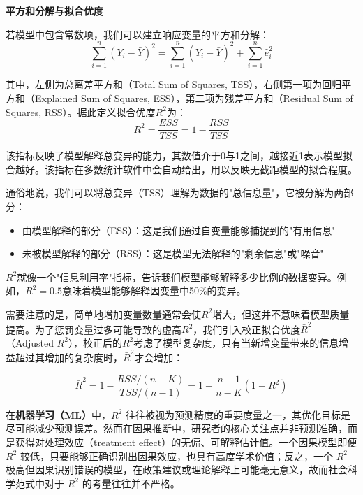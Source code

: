 \newpage

\textbf{平方和分解与拟合优度}

若模型中包含常数项，我们可以建立响应变量的平方和分解：
\begin{equation}
	\sum_{i=1}^n (Y_i - \bar{Y})^2 = \sum_{i=1}^n (\hat{Y}_i - \bar{Y})^2 + \sum_{i=1}^n \hat{e}_i^2
\end{equation}

其中，左侧为总离差平方和（Total Sum of Squares, TSS），右侧第一项为回归平方和（Explained Sum of Squares, ESS），第二项为残差平方和（Residual Sum of Squares, RSS）。据此定义拟合优度$R^2$为：
\begin{equation}
	R^2 = \frac{ESS}{TSS} = 1 - \frac{RSS}{TSS}
\end{equation}

该指标反映了模型解释总变异的能力，其数值介于0与1之间，越接近1表示模型拟合越好。该指标在多数统计软件中会自动给出，用以反映无截距模型的拟合程度。

通俗地说，我们可以将总变异（TSS）理解为数据的"总信息量"，它被分解为两部分：
\begin{itemize}
\item 由模型解释的部分（ESS）：这是我们通过自变量能够捕捉到的"有用信息"
\item 未被模型解释的部分（RSS）：这是模型无法解释的"剩余信息"或"噪音"
\end{itemize}

$R^2$就像一个"信息利用率"指标，告诉我们模型能够解释多少比例的数据变异。例如，$R^2=0.5$意味着模型能够解释因变量中50\%的变异。

需要注意的是，简单地增加变量数量通常会使$R^2$增大，但这并不意味着模型质量提高。为了惩罚变量过多可能导致的虚高$R^2$，我们引入校正拟合优度$\bar{R}^2$（Adjusted $R^2$），校正后的$R^2$考虑了模型复杂度，只有当新增变量带来的信息增益超过其增加的复杂度时，$\bar{R}^2$才会增加：

\begin{equation}
	\bar{R}^2 = 1 - \frac{RSS/(n-K)}{TSS/(n-1)} = 1 - \frac{n-1}{n-K}(1-R^2)
\end{equation}

在\textbf{机器学习（ML）}中，$R^2$ 往往被视为预测精度的重要度量之一，其优化目标是尽可能减少预测误差。然而在因果推断中，研究者的核心关注点并非预测准确，而是获得对处理效应（treatment effect）的无偏、可解释估计值。一个因果模型即便 $R^2$ 较低，只要能够正确识别出因果效应，也具有高度学术价值；反之，一个 $R^2$ 极高但因果识别错误的模型，在政策建议或理论解释上可能毫无意义，故而社会科学范式中对于 $R^2$ 的考量往往并不严格。

